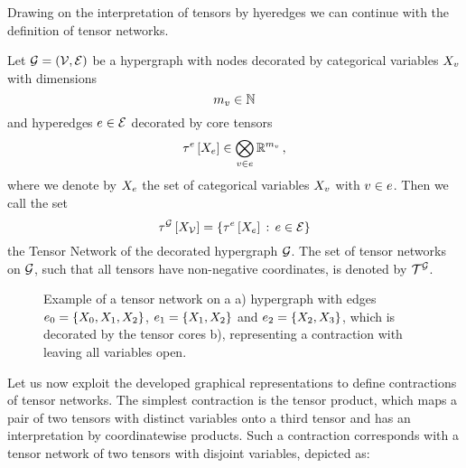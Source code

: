 Drawing on the interpretation of tensors by hyeredges we can continue with the definition of tensor networks.

\begin{definition}\label{def:tensorNetwork}
	Let $\mathcal{G}=(\mathcal{V},\mathcal{E})$ be a hypergraph with nodes decorated by categorical variables $X_{v}$ with dimensions
		\[ m_{v} \in \mathbb{N} \]
	and hyperedges $e\in\mathcal{E}$ decorated by core tensors
		\[ \tau^{e}\left[X_{e}\right] \in \bigotimes_{v\in e}\mathbb{R}^{m_{v}} \, , \]
	where we denote by $X_{e}$ the set of categorical variables $X_{v}$ with $v\in e$.
	Then we call the set
		\[ \tau^{\mathcal{G}}\left[X_{\mathcal{V}}\right] = \{\tau^{e}\left[X_{e}\right]  \, : \, e\in\mathcal{E}\} \]
	the Tensor Network of the decorated hypergraph $\mathcal{G}$.
	The set of tensor networks on $\mathcal{G}$, such that all tensors have non-negative coordinates, is denoted by $\mathcal{T}^{\mathcal{G}}$.
\end{definition}


\begin{figure}
	\begin{center}
		
	\end{center}
	\caption{
	Example of a tensor network on a
	a) hypergraph with edges $e_0=\{X_{0},X_{1},X_{2}\}$, $e_1=\{X_{1},X_{2}\}$ and $e_2=\{X_{2},X_{3}\}$,
	which is decorated by the tensor cores b), representing a contraction with leaving all variables open.
	}\label{fig:network}
\end{figure}






Let us now exploit the developed graphical representations to define contractions of tensor networks.
The simplest contraction is the tensor product, which maps a pair of two tensors with distinct variables onto a third tensor and has an interpretation by coordinatewise products.
Such a contraction corresponds with a tensor network of two tensors with disjoint variables, depicted as:
\begin{center}
	
\end{center}


